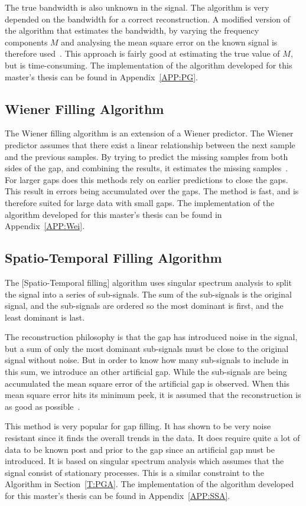 The true bandwidth is also unknown in the signal. The  algorithm is very depended on the bandwidth for a correct reconstruction. A modified version of the algorithm that estimates the bandwidth, by varying the frequency components $M$ and analysing the mean square error on the known signal is therefore used~\cite{RefWorks:13}. This approach is fairly good at estimating the true value of $M$, but is time-consuming. The implementation of the algorithm developed for this master's thesis can be found in Appendix~\ref{APP:PG}.

\subsection{Wiener Filling Algorithm}
The Wiener filling algorithm is an extension of a Wiener predictor. The Wiener predictor assumes that there exist a linear relationship between the next sample and the previous samples. By trying to predict the missing samples from both sides of the gap, and combining the results, it estimates the missing samples~\citep{RefWorks:14}. For larger gaps does this methods rely on earlier predictions to close the gaps. This result in errors being accumulated over the gaps. The method is fast, and is therefore suited for large data with small gaps. The implementation of the algorithm developed for this master's thesis can be found in Appendix~\ref{APP:Wei}.

\subsection{Spatio-Temporal Filling Algorithm}
The [Spatio-Temporal filling] algorithm uses singular spectrum analysis to split the signal into a series of sub-signals. The sum of the sub-signals is the original signal, and the sub-signals are ordered so the most dominant is first, and the least dominant is last. 

The reconstruction philosophy is that the gap has introduced noise in the signal, but a sum of only the most dominant sub-signals must be close to the original signal without noise. But in order to know how many sub-signals to include in this sum, we introduce an other artificial gap. While the sub-signals are being accumulated the mean square error of the artificial gap is observed. When this mean square error hits its minimum peek, it is assumed that the reconstruction is as good as possible~\cite{RefWorks:15}.

This method is very popular for gap filling. It has shown to be very noise resistant since it finds the overall trends in the data. It does require quite a lot of data to be known post and prior to the gap since an artificial gap must be introduced. It is based on singular spectrum analysis which assumes that the signal consist of stationary processes. This is a similar constraint to the  Algorithm in Section~\ref{T:PGA}. The implementation of the algorithm developed for this master's thesis can be found in Appendix~\ref{APP:SSA}.

